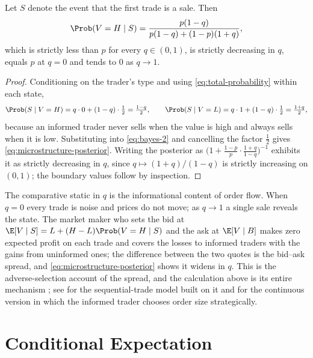 \begin{proposition}\label{prop:microstructure}
	Let $S$ denote the event that the first trade is a sale. Then
	\begin{equation}\label{eq:microstructure-posterior}
		\Prob(V=H\mid S)=\frac{p(1-q)}{p(1-q)+(1-p)(1+q)},
	\end{equation}
	which is strictly less than $p$ for every $q\in(0,1)$, is strictly decreasing in
	$q$, equals $p$ at $q=0$ and tends to $0$ as $q\to1$.
\end{proposition}

\begin{proof}
	Conditioning on the trader's type and using
	\eqref{eq:total-probability} within each state,
	\[
		\Prob(S\mid V=H)=q\cdot0+(1-q)\cdot\tfrac12=\tfrac{1-q}{2},
		\qquad
		\Prob(S\mid V=L)=q\cdot1+(1-q)\cdot\tfrac12=\tfrac{1+q}{2},
	\]
	because an informed trader never sells when the value is high and always sells
	when it is low. Substituting into \eqref{eq:bayes-2} and cancelling the factor
	$\tfrac12$ gives \eqref{eq:microstructure-posterior}. Writing the posterior as
	$\bigl(1+\frac{1-p}{p}\cdot\frac{1+q}{1-q}\bigr)^{-1}$ exhibits it as strictly
	decreasing in $q$, since $q\mapsto(1+q)/(1-q)$ is strictly increasing on
	$(0,1)$; the boundary values follow by inspection.
\end{proof}

The comparative static in $q$ is the informational content of order flow. When
$q=0$ every trade is noise and prices do not move; as $q\to1$ a single sale
reveals the state. The market maker who sets the bid at
$\E[V\mid S]=L+(H-L)\Prob(V=H\mid S)$ and the ask at $\E[V\mid B]$ makes
zero expected profit on each trade and covers the losses to informed traders with
the gains from uninformed ones; the difference between the two quotes is the
bid--ask spread, and \eqref{eq:microstructure-posterior} shows it widens in $q$.
This is the adverse-selection account of the spread, and the calculation above is
its entire mechanism \autocite[slide 12]{fukuda2026probability}; see
\textcite[Sec.~3.A.1]{ohara1998market} for the sequential-trade model built on
it and \textcite{kyle1985continuous} for the continuous version in which the
informed trader chooses order size strategically.

\section{Conditional Expectation}\label{sec:prob-conditional}

